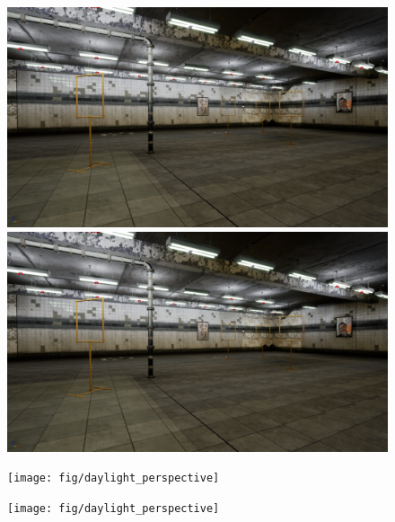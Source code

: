 \begin{figure}[hbtp]
	\centering
	\begin{minipage}{0.49\textwidth}
		\includegraphics[width=\textwidth]{fig/basement_perspective}
	\end{minipage}
	\begin{minipage}{0.49\textwidth}
	\includegraphics[width=\textwidth]{fig/basement_perspective}
\end{minipage}

\begin{minipage}{0.49\textwidth}
	\texttt{[image: fig/daylight\_perspective]}
\end{minipage}
\begin{minipage}{0.49\textwidth}
	\texttt{[image: fig/daylight\_perspective]}
\end{minipage}


\end{figure}
